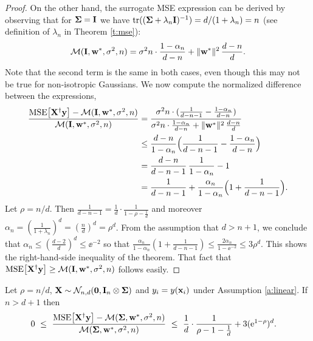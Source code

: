 \begin{proof}
  On the other hand, the surrogate MSE expression can be derived by
observing that for $\mathbf{\Sigma}=\mathbf I$ we have
$\mathrm{tr}((\mathbf{\Sigma}+\lambda_n\mathbf I)^{-1})=d/(1+\lambda_n)=n$ (see definition of
$\lambda_n$ in Theorem \ref{t:mse}):
  \begin{align*}
    \mathcal M(\mathbf I, \mathbf w^*,\sigma^2,n) =
    \sigma^2n\cdot\frac{1-\alpha_n}{d-n} + \|\mathbf w^*\|^2\,\frac{d-n}{d}.
  \end{align*}
  Note that the second term is the same in both cases, even though
  this may not be true for non-isotropic Gaussians. We now compute the
  normalized difference between the
  expressions,
  \begin{align*}
 \frac{{\mathrm{MSE}\big[\mathbf X^\dagger\mathbf y\big]}-\mathcal M(\mathbf I, \mathbf w^*,\sigma^2,n)}{\mathcal M(\mathbf I,
    \mathbf w^*,\sigma^2,n)}
    &= \frac{\sigma^2n\cdot(\frac1{d-n-1} -
    \frac{1-\alpha_n}{d-n})}{\sigma^2n\cdot\frac{1-\alpha_n}{d-n} +
    \|\mathbf w^*\|^2\,\frac{d-n}{d}}\\
&\leq \frac {d-n}{1-\alpha_n}
\Big(\frac1{d-n-1}-\frac{1-\alpha_n}{d-n}\Big)\\
    &=\frac{d-n}{d-n-1}\,\frac{1}{1-\alpha_n}- 1\\
    &=\frac1{d-n-1} + \frac{\alpha_n}{1-\alpha_n}\Big(1+\frac1{d-n-1}\Big).
  \end{align*}
Let $\rho=n/d$. Then $\frac1{d-n-1} = \frac1d\cdot
\frac1{1-\rho-\frac1d}$ and moreover
$\alpha_n = (\frac1{1+\lambda_n})^d=(\frac
nd)^d=\rho^d$. From the assumption that $d>n+1$, we
conclude that $\alpha_n \leq (\frac{d-2}{d})^d\leq \ee^{-2}$
so that $\frac{\alpha_n}{1-\alpha_n}(1+\frac1{d-n-1})\leq
  \frac{2 \alpha_n}{1-\ee^{-2}}\leq 3\rho^d$. This shows the right-hand-side inequality of the
  theorem. That fact that ${\mathrm{MSE}\big[\mathbf X^\dagger\mathbf y\big]}\geq\mathcal M(\mathbf I,
  \mathbf w^*,\sigma^2,n)$ follows easily.
\end{proof}
\begin{lemma}\label{l:asymptotic-over}
  Let $\rho=n/d$, $\mathbf X\sim \mathcal{N}_{n,d}(\mathbf 0,\mathbf I_n \otimes \mathbf{\Sigma})$ and $y_i=y(\mathbf x_i)$ under Assumption
  \ref{a:linear}. If $n>d+1$ then
  \begin{align*}
    &0\ \leq\ \frac{{\mathrm{MSE}\big[\mathbf X^\dagger\mathbf y\big]}-\mathcal M(\mathbf{\Sigma},
\mathbf w^*,\sigma^2,n)}{\mathcal M(\mathbf{\Sigma},\mathbf w^*,\sigma^2,n)}\ \leq\
\frac1d\cdot \frac{1}{\rho-1-\frac1d} + 3(\mathrm{e}^{1-\rho})^d.
  \end{align*}
\end{lemma}
